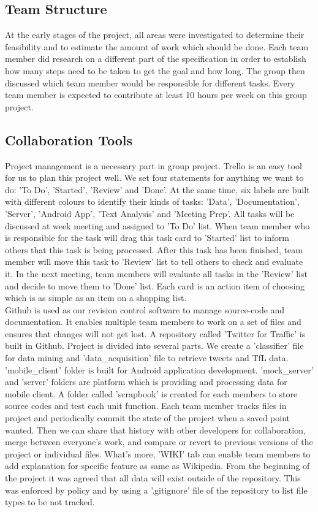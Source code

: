 \subsection{Team Structure}
At the early stages of the project, all areas were investigated to determine their feasibility and to estimate the amount of work which should be done. Each team member did research on a different part of the specification in order to establish how many steps need to be taken to get the goal and how long. The group then discussed which team member would be responsible for different tasks. Every team member is expected to contribute at least 10 hours per week on this group project.\\
\subsection{Collaboration Tools}
Project management is a necessary part in group project. Trello is an easy tool for us to plan this project well. We set four statements for anything we want to do: 'To Do', 'Started', 'Review' and 'Done'. At the same time, six labels are built with different colours to identify their kinds of tasks: 'Data', 'Documentation', 'Server', 'Android App', 'Text Analysis' and 'Meeting Prep'. All tasks will be discussed at week meeting and assigned to 'To Do' list. When team member who is responsible for the task will drag this task card to 'Started' list to inform others that this task is being processed. After this task has been finished, team member will move this task to 'Review' list to tell others to check and evaluate it. In the next meeting, team members will evaluate all tasks in the 'Review' list and decide to move them to 'Done' list. Each card is an action item of choosing which is as simple as an item on a shopping list.\\
Github is used as our revision control software to manage source-code and documentation. It enables multiple team members to work on a set of files and ensures that changes will not get lost. A repository called 'Twitter for Traffic' is built in Github. Project is divided into several parts. We create a 'classifier' file for data mining and 'data\_acquisition' file to retrieve tweets and TfL data. 'mobile\_client' folder is built for Android application development. 'mock\_server' and 'server' folders are platform which is providing and processing data for mobile client. A folder called 'scrapbook' is created for each members to store source codes and test each unit function. Each team member tracks files in project and periodically commit the state of the project when a saved point wanted. Then we can share that history with other developers for collaboration, merge between everyone's work, and compare or revert to previous versions of the project or individual files. What's more, 'WIKI' tab can enable team members to add explanation for specific feature as same as Wikipedia. From the beginning of the project it was agreed that all data will exist outside of the repository. This was enforced by policy and by using a '.gitignore' file of the repository to list file types to be not tracked.
